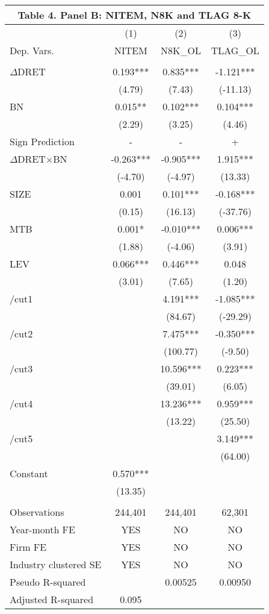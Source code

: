 \begin{table}[htbp] \label{T4PB}
  \centering
    \begin{tabular}{lccc}
    \multicolumn{4}{c}{\textbf{Table 4. Panel B: NITEM, N8K and TLAG 8-K}} \\
    \midrule
      & (1) & (2) & (3) \\
    Dep. Vars. & NITEM & N8K\_OL & TLAG\_OL \\
    \midrule
      &   &   &  \\
    $\Delta$DRET & 0.193*** & 0.835*** & -1.121*** \\
    & (4.79) & (7.43) & (-11.13) \\
    BN & 0.015** & 0.102*** & 0.104*** \\
    & (2.29) & (3.25) & (4.46) \\
    \rowcolor[rgb]{ .933,  .925,  .882} Sign Prediction & - & - & + \\
    \rowcolor[rgb]{ .933,  .925,  .882} $\Delta$DRET$\times$BN & -0.263*** & -0.905*** & 1.915*** \\
    \rowcolor[rgb]{ .933,  .925,  .882}   & (-4.70) & (-4.97) & (13.33) \\
    SIZE & 0.001 & 0.101*** & -0.168*** \\
    & (0.15) & (16.13) & (-37.76) \\
    MTB & 0.001* & -0.010*** & 0.006*** \\
    & (1.88) & (-4.06) & (3.91) \\
    LEV & 0.066*** & 0.446*** & 0.048 \\
    & (3.01) & (7.65) & (1.20) \\
    /cut1 &   & 4.191*** & -1.085*** \\
    &   & (84.67) & (-29.29) \\
    /cut2 &   & 7.475*** & -0.350*** \\
    &   & (100.77) & (-9.50) \\
    /cut3 &   & 10.596*** & 0.223*** \\
    &   & (39.01) & (6.05) \\
    /cut4 &   & 13.236*** & 0.959*** \\
    &   & (13.22) & (25.50) \\
    /cut5 &   &   & 3.149*** \\
    &   &   & (64.00) \\
    Constant & 0.570*** &   &  \\
    & (13.35) &   &  \\
    &   &   &  \\
    Observations & 244,401 & 244,401 & 62,301 \\
    Year-month FE & YES & NO & NO \\
    Firm FE & YES & NO & NO \\
    Industry clustered SE & YES & NO & NO \\
    Pseudo R-squared &   & 0.00525 & 0.00950 \\
    Adjusted R-squared & 0.095 &   &  \\
    \bottomrule
    
    \end{tabular}%
\end{table}%
